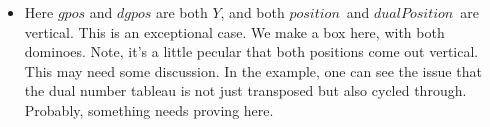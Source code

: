 \documentclass[12pt]{article}
\numberwithin{equation}{section}
\newcommand{\verticalDominoRS}[3]{\filldraw [dominoRSStyle] (#2 - 1 + \eps,  #1 - 1 + \eps) rectangle + (1 - \teps,2 -\teps) node [dominoText] {$#3$};}
\newcommand{\pos}{$position$}
\newcommand{\dpos}{$dualPosition$}
\begin{document}
\begin{itemize}
\begin{itemize}
\begin{figure}[H]
      \end{figure}
      \begin{figure}[H]
        \centering
      \end{figure}
    \end{itemize}

    \item Here $gpos$ and $dgpos$ are both $Y$, and both \pos\ and \dpos\ are vertical.
    This is an exceptional case.
    We make a box here, with both dominoes.
    Note, it's a little pecular that both positions come out vertical.
    This may need some discussion.
    In the example, one can see the issue that the dual number tableau is not just transposed but also cycled through.
    Probably, something needs proving here.
    \begin{figure}[H]
      \centering
\end{figure}
\end{itemize}
\end{document}
